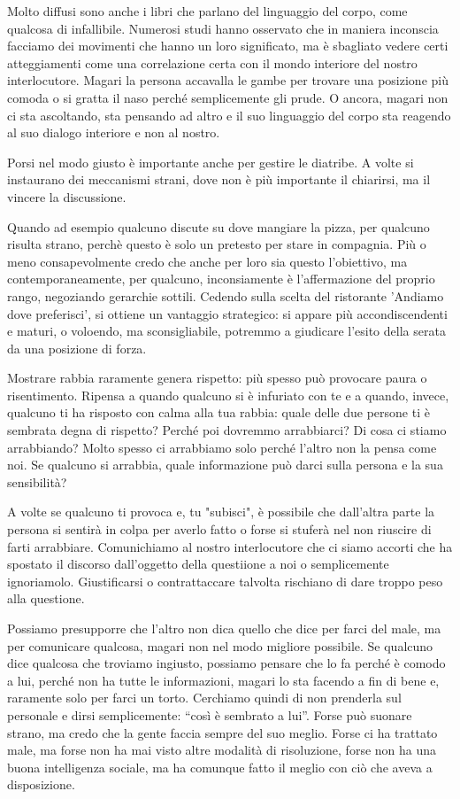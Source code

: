 \documentclass[12pt]{book} %
\begin{document}
Molto diffusi sono anche i libri che parlano del linguaggio del corpo, come qualcosa di infallibile. Numerosi studi
hanno osservato che in maniera inconscia facciamo dei movimenti che hanno un loro significato, ma è
sbagliato vedere certi atteggiamenti come una correlazione certa con il mondo interiore del nostro interlocutore.
Magari la persona accavalla le gambe per trovare una posizione più comoda o si gratta il naso perché semplicemente gli
prude. O ancora, magari non ci sta ascoltando, sta pensando ad altro e il suo linguaggio del corpo sta reagendo al suo
dialogo interiore e non al nostro.

Porsi nel modo giusto è importante anche per gestire le diatribe. A volte si instaurano dei meccanismi
strani, dove non è più importante il chiarirsi, ma il vincere la discussione. 

Quando ad esempio qualcuno discute su dove mangiare la pizza, per qualcuno risulta strano, perchè questo è solo un pretesto per stare in compagnia. Più o meno consapevolmente credo che anche per loro sia questo l'obiettivo, ma contemporaneamente, per qualcuno, inconsiamente è l'affermazione del proprio rango, negoziando gerarchie sottili. Cedendo sulla scelta del ristorante 'Andiamo dove preferisci', si ottiene un vantaggio strategico: si appare più accondiscendenti e maturi, o voloendo, ma sconsigliabile, potremmo a giudicare l'esito della serata da una posizione di forza.

Mostrare rabbia raramente genera rispetto: più spesso può provocare paura o risentimento. Ripensa a quando qualcuno si è infuriato con te e a quando, invece, qualcuno ti ha risposto con calma alla tua rabbia: quale delle due persone ti è sembrata degna di rispetto? 
Perché poi dovremmo arrabbiarci? Di cosa ci stiamo arrabbiando? Molto spesso ci arrabbiamo solo perché l'altro non la pensa come noi.
Se qualcuno si arrabbia, quale informazione può darci sulla persona e la sua sensibilità?

A volte se qualcuno ti provoca e, tu "subisci", è possibile che dall'altra parte la persona si sentirà in colpa per averlo fatto o forse si stuferà nel non riuscire di farti arrabbiare. Comunichiamo al nostro interlocutore che ci siamo accorti che ha spostato il discorso dall'oggetto della questiione a noi o semplicemente ignoriamolo. 
Giustificarsi o contrattaccare talvolta rischiano di dare troppo peso alla questione.

Possiamo presupporre che l'altro non dica quello che dice per farci del male, ma per comunicare qualcosa, magari non nel modo migliore possibile.
Se qualcuno dice qualcosa che troviamo ingiusto, possiamo pensare che lo fa perché è comodo a lui, perché non ha tutte le informazioni, magari lo sta facendo a fin di bene e, raramente solo per farci un torto. Cerchiamo quindi di non prenderla sul personale e dirsi semplicemente: “così è sembrato a lui”.
Forse può suonare strano, ma credo che la gente faccia sempre del suo meglio. Forse ci ha trattato male, ma forse non ha mai visto altre modalità di risoluzione, forse non ha una buona intelligenza sociale, ma ha comunque fatto il meglio con ciò che aveva a disposizione.
\end{document}

